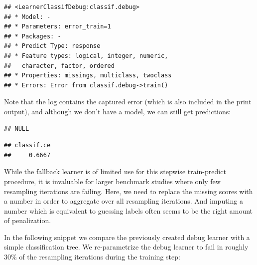 \documentclass[]{article}
\newenvironment{Shaded}{\begin{snugshade}}{\end{snugshade}}
\newcommand{\KeywordTok}[1]{\textcolor[rgb]{0.13,0.29,0.53}{\textbf{#1}}}
\newcommand{\NormalTok}[1]{#1}
\newcommand{\OperatorTok}[1]{\textcolor[rgb]{0.81,0.36,0.00}{\textbf{#1}}}
\newcommand{\StringTok}[1]{\textcolor[rgb]{0.31,0.60,0.02}{#1}}
\renewenvironment{Shaded} {\begin{snugshade}\small} {\end{snugshade}}
\begin{document}
\begin{verbatim}
## <LearnerClassifDebug:classif.debug>
## * Model: -
## * Parameters: error_train=1
## * Packages: -
## * Predict Type: response
## * Feature types: logical, integer, numeric,
##   character, factor, ordered
## * Properties: missings, multiclass, twoclass
## * Errors: Error from classif.debug->train()
\end{verbatim}

Note that the log contains the captured error (which is also included in the print output), and although we don't have a model, we can still get predictions:

\begin{Shaded}
\end{Shaded}

\begin{verbatim}
## NULL
\end{verbatim}

\begin{Shaded}
\end{Shaded}

\begin{verbatim}
## classif.ce 
##     0.6667
\end{verbatim}

While the fallback learner is of limited use for this stepwise train-predict procedure, it is invaluable for larger benchmark studies where only few resampling iterations are failing.
Here, we need to replace the missing scores with a number in order to aggregate over all resampling iterations.
And imputing a number which is equivalent to guessing labels often seems to be the right amount of penalization.

In the following snippet we compare the previously created debug learner with a simple classification tree.
We re-parametrize the debug learner to fail in roughly 30\% of the resampling iterations during the training step:
\end{document}

